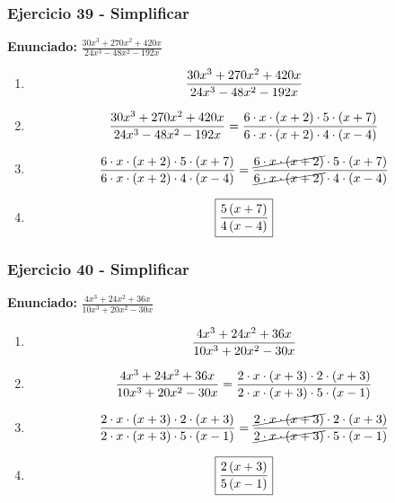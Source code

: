 \documentclass[11pt,a4paper]{article}
\newcommand{\fitmath}[1]{%
\[
\setbox0=\hbox{$\displaystyle #1$}%
\ifdim\wd0>\linewidth
\resizebox{\linewidth}{!}{$\displaystyle #1$}%
\else
#1%
\fi
\]
}
\begin{document}
\vspace{0.12cm}
\subsubsection*{Ejercicio 39 - Simplificar}
\textbf{Enunciado:} $ \frac{30 x^{3} + 270 x^{2} + 420 x}{24 x^{3} - 48 x^{2} - 192 x} $\par
\begin{enumerate}[leftmargin=2em]
\item \fitmath{\frac{30 x^{3} + 270 x^{2} + 420 x}{24 x^{3} - 48 x^{2} - 192 x}}
\item \fitmath{\frac{30 x^{3} + 270 x^{2} + 420 x}{24 x^{3} - 48 x^{2} - 192 x}=\frac{6\cdot x\cdot \left(x + 2\right)\cdot 5\cdot \left(x + 7\right)}{6\cdot x\cdot \left(x + 2\right)\cdot 4\cdot \left(x - 4\right)}}
\item \fitmath{\frac{6\cdot x\cdot \left(x + 2\right)\cdot 5\cdot \left(x + 7\right)}{6\cdot x\cdot \left(x + 2\right)\cdot 4\cdot \left(x - 4\right)}=\frac{\cancel{6\cdot x\cdot \left(x + 2\right)}\cdot 5\cdot \left(x + 7\right)}{\cancel{6\cdot x\cdot \left(x + 2\right)}\cdot 4\cdot \left(x - 4\right)}}
\item \fitmath{\boxed{\frac{5 \left(x + 7\right)}{4 \left(x - 4\right)}}}
\end{enumerate}

\vspace{0.12cm}
\subsubsection*{Ejercicio 40 - Simplificar}
\textbf{Enunciado:} $ \frac{4 x^{3} + 24 x^{2} + 36 x}{10 x^{3} + 20 x^{2} - 30 x} $\par
\begin{enumerate}[leftmargin=2em]
\item \fitmath{\frac{4 x^{3} + 24 x^{2} + 36 x}{10 x^{3} + 20 x^{2} - 30 x}}
\item \fitmath{\frac{4 x^{3} + 24 x^{2} + 36 x}{10 x^{3} + 20 x^{2} - 30 x}=\frac{2\cdot x\cdot \left(x + 3\right)\cdot 2\cdot \left(x + 3\right)}{2\cdot x\cdot \left(x + 3\right)\cdot 5\cdot \left(x - 1\right)}}
\item \fitmath{\frac{2\cdot x\cdot \left(x + 3\right)\cdot 2\cdot \left(x + 3\right)}{2\cdot x\cdot \left(x + 3\right)\cdot 5\cdot \left(x - 1\right)}=\frac{\cancel{2\cdot x\cdot \left(x + 3\right)}\cdot 2\cdot \left(x + 3\right)}{\cancel{2\cdot x\cdot \left(x + 3\right)}\cdot 5\cdot \left(x - 1\right)}}
\item \fitmath{\boxed{\frac{2 \left(x + 3\right)}{5 \left(x - 1\right)}}}
\end{enumerate}
\end{document}
